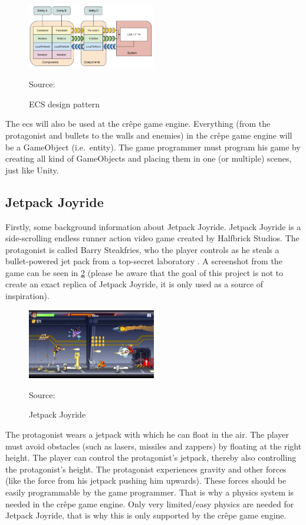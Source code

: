 \documentclass{projdoc}
\begin{document}
\begin{figure}
	\centering
	\includegraphics[width=0.5\textwidth]{img/ECSBlockDiagram.png}
	\caption{ECS design pattern}
	Source: \autocite{img:ecs-block-diag}
	\label{fig:ecs-block-diagram}
\end{figure}

The \gls{ecs} will also be used at the cr\^epe game engine. Everything (from the
protagonist and bullets to the walls and enemies) in the cr\^epe game engine will be
a GameObject (i.e.~entity). The game programmer must program his game by creating all
kind of GameObjects and placing them in one (or multiple) scenes, just like Unity.

\subsection{Jetpack Joyride}

Firstly, some background information about Jetpack Joyride. Jetpack Joyride is a
side-scrolling endless runner action video game created by Halfbrick Studios. The
protagonist is called Barry Steakfries, who the player controls as he steals a
bullet-powered jet pack from a top-secret laboratory
\autocite{wikipedia:jetpack-joyride}. A screenshot from the game can be seen in
\cref{fig:jetpack-joyride} (please be aware that the goal of this project is not to
create an exact replica of Jetpack Joyride, it is only used as a source of
inspiration).

\begin{figure}
	\centering
	\includegraphics[width=0.5\textwidth]{img/JetpackJoyride.jpg}
	\caption{Jetpack Joyride}
	Source: \autocite{img:jetpack-joyride}
	\label{fig:jetpack-joyride}
\end{figure}

The protagonist wears a jetpack with which he can float in the air. The player must
avoid obstacles (such as lasers, missiles and zappers) by floating at the right
height. The player can control the protagonist's jetpack, thereby also controlling
the protagonist's height. The protagonist experiences gravity and other forces (like
the force from his jetpack pushing him upwards). These forces should be easily
programmable by the game programmer. That is why a physics system is needed in the
cr\^epe game engine. Only very limited/easy physics are needed for Jetpack Joyride,
that is why this is only supported by the cr\^epe game engine.
\end{document}
